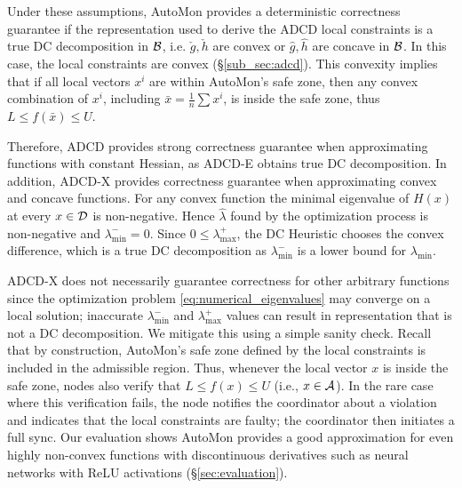 Under these assumptions,
AutoMon provides a deterministic correctness guarantee if the representation used to derive the ADCD local constraints is a true DC decomposition in $\mathcal{B}$, i.e. $\check{g} , \check{h}$ are convex or $\hat{g}, \hat{h}$ are concave in $\mathcal{B}$.
In this case, the local constraints are convex (\S\ref{sub_sec:adcd}).
This convexity implies that if all local vectors $x^i$ are within AutoMon's safe zone, then any convex combination of $x^i$, including $\bar{x}=\frac{1}{n}\sum x^i$, is inside the safe zone, thus $L \le f(\bar{x}) \le U$.

Therefore, ADCD provides strong correctness guarantee when approximating functions with constant Hessian, as ADCD-E obtains true DC decomposition.
%
In addition, ADCD-X provides correctness guarantee when approximating convex and concave functions.
For any convex function the minimal eigenvalue of $H(x)$ at every $x \in \mathcal{D}$ is non-negative.
Hence $\hat{\lambda}$ found by the optimization process is non-negative and $\lambda^-_{\min}=0$.
Since $0 \le \lambda^+_{\max}$, the DC Heuristic chooses the convex difference, which is a true DC decomposition as $\lambda^-_{\min}$ is a lower bound for $\lambda_{\min}$.

ADCD-X does not necessarily guarantee correctness for other arbitrary functions since the optimization problem \eqref{eq:numerical_eigenvalues} may converge on a local solution; inaccurate $\lambda^-_{\min}$ and $\lambda^+_{\max}$ values can result in representation that is not a DC decomposition.
%
We mitigate this using a simple sanity check.
Recall that by construction, AutoMon's safe zone defined by the local constraints is included in the admissible region.
Thus, whenever the local vector $x$ is inside the safe zone, nodes also verify that $L \leq f(x) \leq U$ (i.e., $x \in \mathcal{A}$).
%
In the rare case where this verification fails, the node notifies the coordinator about a violation and indicates that the local constraints are faulty;
the coordinator then initiates a full sync.
%
Our evaluation shows AutoMon provides a good approximation for even highly non-convex functions with discontinuous derivatives
such as neural networks with ReLU activations (\S\ref{sec:evaluation}).


